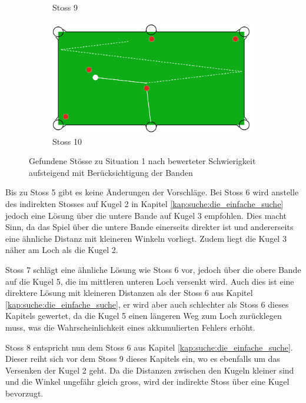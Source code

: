 \begin{figure}[h!]
\begin{subfigure}[b]{0.3\textwidth}
        \caption{Stoss 9}
        \label{fig:situation_rail_1_solution_9}
    \end{subfigure}
    \hfill
    \begin{subfigure}[b]{0.3\textwidth}
        \centering
        \includegraphics[width=1.0\linewidth]{../common/04_results/resources/simple_search/situation_diverse_solution_rail_10.PNG}
        \caption{Stoss 10}
        \label{fig:situation_rail_1_solution_10}
    \end{subfigure}
    \caption{Gefundene Stösse zu Situation 1 nach bewerteter Schwierigkeit aufsteigend mit Berücksichtigung der Banden}
    \label{fig:situation_1_solutions_bande}
\end{figure}

Bis zu Stoss 5 gibt es keine Änderungen der Vorschläge. Bei Stoss 6 wird
anstelle des indirekten Stosses auf Kugel 2 in Kapitel \ref{kap:suche:die_einfache_suche} jedoch eine Lösung über
die untere Bande auf Kugel 3 empfohlen. Dies macht Sinn, da das Spiel über
die untere Bande einerseits direkter ist und andererseits eine ähnliche Distanz
mit kleineren Winkeln vorliegt. Zudem liegt die Kugel 3 näher am Loch als die Kugel 2.

Stoss 7 schlägt eine ähnliche Lösung wie Stoss 6 vor, jedoch über die obere Bande auf die Kugel 5, die im
mittleren unteren Loch versenkt wird. Auch dies ist eine direktere Lösung mit kleineren Distanzen
als der Stoss 6 aus Kapitel \ref{kap:suche:die_einfache_suche}, er wird aber auch schlechter als Stoss 6 dieses Kapitels
gewertet, da die Kugel 5 einen längeren Weg zum Loch zurücklegen muss, was die Wahrscheinlichkeit
eines akkumulierten Fehlers erhöht.

Stoss 8 entspricht nun dem Stoss 6 aus Kapitel \ref{kap:suche:die_einfache_suche}. Dieser reiht sich vor
dem Stoss 9 dieses Kapitels ein, wo es ebenfalls um das Versenken der Kugel 2 geht. Da die Distanzen
zwischen den Kugeln kleiner sind und die Winkel ungefähr gleich gross, wird der indirekte Stoss
über eine Kugel bevorzugt.

